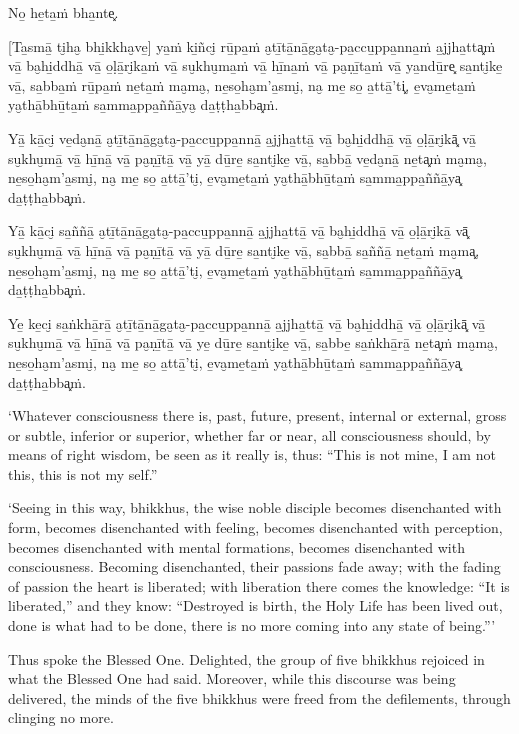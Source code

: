 No̱ he̱ta̱ṁ bha̱nte͓.

[Ta̱smā̱ ti̮ha̮ bhi̱kkha̮ve̱] ya̱ṁ ki̱ñci̮ rū̱pa̱ṁ a̮tī̱tā̱nā̱ga̮ta̮-pa̱ccu̱ppa̱nna̱ṁ a̱jjha̱tta͓ṁ
vā̱ ba̮hi̱ddhā̱ vā̱ o̱ḷā̱ri̮ka̱ṁ vā̱ su̮khu̮ma̱ṁ vā̱ hī̱na̱ṁ vā̱ pa̮ṇī̱ta̱ṁ vā̱ ya̱ndū̱re͓
sa̱nti̮ke̱ vā̱, sa̱bba̱ṁ rū̱pa̱ṁ ne̱ta̱ṁ ma̮ma̮, ne̱so̱ha̮m'a̱smi̮, na̮ me̱ so̱ a̱ttā̱'ti͓,
e̱va̮me̱ta̱ṁ ya̮thā̱bhū̱ta̱ṁ sa̱mma̱ppa̱ññā̱ya̮ da̱ṭṭha̱bba͓ṁ.

Yā̱ kā̱ci̮ ve̱da̮nā̱ a̮tī̱tā̱nā̱ga̮ta̮-pa̱ccu̱ppa̱nnā̱ a̱jjha̱ttā̱ vā̱ ba̮hi̱ddhā̱ vā̱ o̱ḷā̱ri̮kā͓
vā̱ su̮khu̮mā̱ vā̱ hī̱nā̱ vā̱ pa̮ṇī̱tā̱ vā̱ yā̱ dū̱re̱ sa̱nti̮ke̱ vā̱, sa̱bbā̱ ve̱da̮nā̱ ne̱ta͓ṁ
ma̮ma̮, ne̱so̱ha̮m'a̱smi̮, na̮ me̱ so̱ a̱ttā̱'ti̮, e̱va̮me̱ta̱ṁ ya̮thā̱bhū̱ta̱ṁ sa̱mma̱ppa̱ññā̱ya͓
da̱ṭṭha̱bba͓ṁ.

Yā̱ kā̱ci̮ sa̱ññā̱ a̮tī̱tā̱nā̱ga̮ta̮-pa̱ccu̱ppa̱nnā̱ a̱jjha̱ttā̱ vā̱ ba̮hi̱ddhā̱ vā̱ o̱ḷā̱ri̮kā̱ vā͓
su̮khu̮mā̱ vā̱ hī̱nā̱ vā̱ pa̮ṇī̱tā̱ vā̱ yā̱ dū̱re̱ sa̱nti̮ke̱ vā̱, sa̱bbā̱ sa̱ññā̱ ne̱ta̱ṁ ma̮ma͓,
ne̱so̱ha̮m'a̱smi̮, na̮ me̱ so̱ a̱ttā̱'ti̮, e̱va̮me̱ta̱ṁ ya̮thā̱bhū̱ta̱ṁ sa̱mma̱ppa̱ññā̱ya͓
da̱ṭṭha̱bba͓ṁ.

Ye̱ ke̱ci̮ sa̱ṅkhā̱rā̱ a̮tī̱tā̱nā̱ga̮ta̮-pa̱ccu̱ppa̱nnā̱ a̱jjha̱ttā̱ vā̱ ba̮hi̱ddhā̱ vā̱ o̱ḷā̱ri̮kā͓
vā̱ su̮khu̮mā̱ vā̱ hī̱nā̱ vā̱ pa̮ṇī̱tā̱ vā̱ ye̱ dū̱re̱ sa̱nti̮ke̱ vā̱, sa̱bbe̱ sa̱ṅkhā̱rā̱ ne̱ta͓ṁ
ma̮ma̮, ne̱so̱ha̮m'a̱smi̮, na̮ me̱ so̱ a̱ttā̱'ti̮, e̱va̮me̱ta̱ṁ ya̮thā̱bhū̱ta̱ṁ sa̱mma̱ppa̱ññā̱ya͓
da̱ṭṭha̱bba͓ṁ.

\clearpage

\englishText
\markboth{\englishTitle}{\rightmark}

‘Whatever consciousness there is, past, future, present, internal or
external, gross or subtle, inferior or superior, whether far or near,
all consciousness should, by means of right wisdom, be seen as it really
is, thus: “This is not mine, I am not this, this is not my self.”

‘Seeing in this way, bhikkhus, the wise noble disciple becomes
disenchanted with form, becomes disenchanted with feeling, becomes
disenchanted with perception, becomes disenchanted with mental
formations, becomes disenchanted with consciousness. Becoming
disenchanted, their passions fade away; with the fading of passion the
heart is liberated; with liberation there comes the knowledge: “It is
liberated,” and they know: “Destroyed is birth, the Holy Life has been
lived out, done is what had to be done, there is no more coming into any
state of being.”\thinspace ’

Thus spoke the Blessed One. Delighted, the group of five bhikkhus
rejoiced in what the Blessed One had said. Moreover, while this discourse was
being delivered, the minds of the five bhikkhus were freed from the
defilements, through clinging no more.

